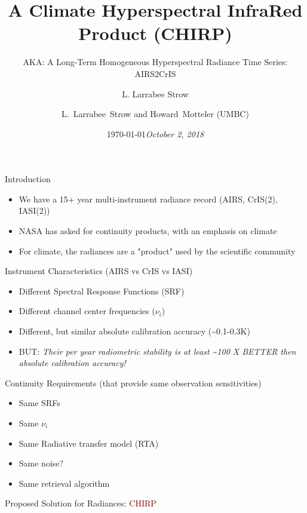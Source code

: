 \documentclass[10pt,t]{beamer}
\author{L. Larrabee Strow}
\date{\today}
\title{\large A Climate Hyperspectral InfraRed Product (CHIRP)}
\date{\textit{\footnotesize October 2, 2018}}
\subtitle{\footnotesize AKA:  A Long-Term Homogeneous Hyperspectral Radiance Time Series: AIRS2CrIS}
\author{L.~Larrabee~Strow and Howard~Motteler (UMBC)}
\begin{document}
\maketitle
{}

\begin{frame}[label={sec:org1b9751c},shrink=20]{Introduction}
\vspace{-0.1in}

\begin{itemize}
\item We have a 15+ year multi-instrument radiance record (AIRS, CrIS(2), IASI(2))
\item NASA has asked for continuity products, with an emphasis on climate
\item For climate, the radiances are a "product" used by the scientific community
\end{itemize}
\begin{block}{Instrument Characteristics (AIRS vs CrIS vs IASI)}
\begin{itemize}
\item Different Spectral Response Functions (SRF)
\item Different channel center frequencies (\(\nu_i\))
\item Different, but similar absolute calibration accuracy (\textasciitilde{}0.1-0.3K)
\item BUT: \emph{Their per year radiometric stability is at least \textasciitilde{}100 X \alert{BETTER} then absolute calibration accuracy!}
\end{itemize}
\end{block}
\begin{block}{Continuity Requirements (that provide same observation sensitivities)}
\begin{itemize}
\item Same SRFs
\item Same \(\nu_i\)
\item Same Radiative transfer model (RTA)
\item Same noise?
\item Same retrieval algorithm
\end{itemize}

\large Proposed Solution for Radiances: \textcolor{maroon}{CHIRP}
\end{block}
\end{frame}
\end{document}
